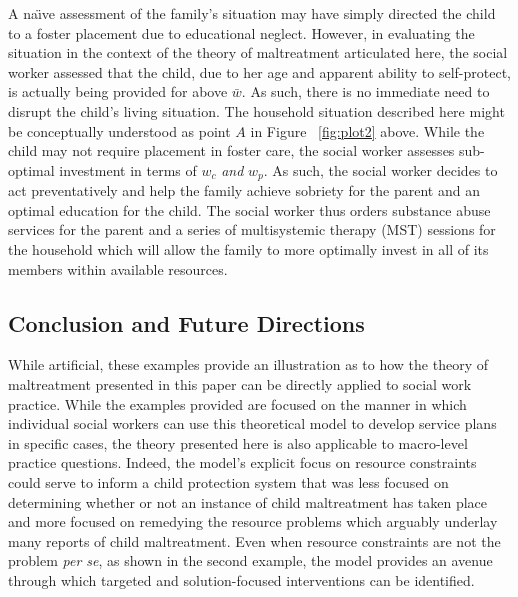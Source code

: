 \documentclass[1p, review]{elsarticle}\usepackage[]{graphicx}\usepackage[]{color}
\begin{document}
A na\"\i ve assessment of the family's situation may have simply directed the child to a foster placement due to educational neglect. However, in evaluating the situation in the context of the theory of maltreatment articulated here, the social worker assessed that the child, due to her age and apparent ability to self-protect, is actually being provided for above $\bar{w}$. As such, there is no immediate need to disrupt the child's living situation. The household situation described here might be conceptually understood as point $A$ in Figure ~\ref{fig:plot2} above. While the child may not require placement in foster care, the social worker assesses sub-optimal investment in terms of $w_c$ \emph{and} $w_p$. As such, the social worker decides to act preventatively and help the family achieve sobriety for the parent and an optimal education for the child. The social worker thus orders substance abuse services for the parent and a series of multisystemic therapy (MST) sessions for the household which will allow the family to more optimally invest in all of its members within available resources.  

\subsection{Conclusion and Future Directions}

While artificial, these examples provide an illustration as to how the theory of maltreatment presented in this paper can be directly applied to social work practice. While the examples provided are focused on the manner in which individual social workers can use this theoretical model to develop service plans in specific cases, the theory presented here is also applicable to macro-level practice questions. Indeed, the model's explicit focus on resource constraints could serve to inform a child protection system that was less focused on determining whether or not an instance of child maltreatment has taken place and more focused on remedying the resource problems which arguably underlay many reports of child maltreatment. Even when resource constraints are not the problem \emph{per se}, as shown in the second example, the model provides an avenue through which targeted and solution-focused interventions can be identified.  
\end{document}
